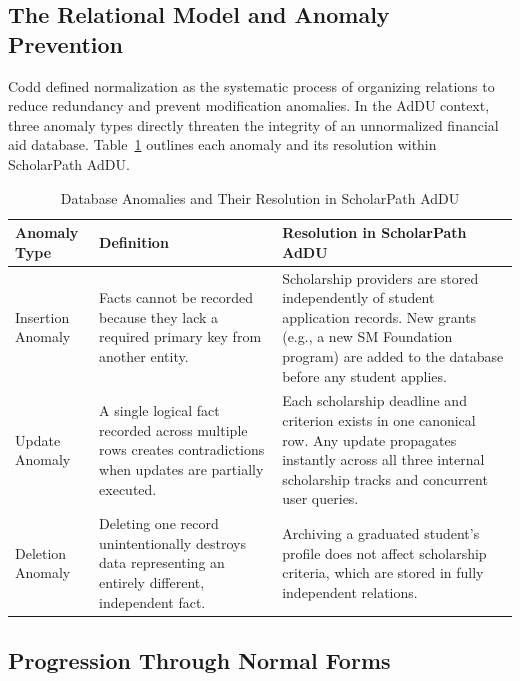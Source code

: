\subsection{The Relational Model and Anomaly Prevention}

Codd \cite{ref17} defined normalization as the systematic process of organizing relations to reduce redundancy and prevent modification anomalies. In the AdDU context, three anomaly types directly threaten the integrity of an unnormalized financial aid database. Table~\ref{tab:anomalies} outlines each anomaly and its resolution within ScholarPath AdDU. \begin{table}[htbp]
  \centering
  \small
  \begin{tabular}{@{}p{2.6cm} p{5.6cm} p{5.6cm}@{}}
    \toprule
    Anomaly Type & Definition & Resolution in ScholarPath AdDU \\
    \midrule
    Insertion Anomaly & Facts cannot be recorded because they lack a required primary key from another entity. & Scholarship providers are stored independently of student application records. New grants (e.g., a new SM Foundation program) are added to the database before any student applies. \\
    \addlinespace
    Update Anomaly & A single logical fact recorded across multiple rows creates contradictions when updates are partially executed. & Each scholarship deadline and criterion exists in one canonical row. Any update propagates instantly across all three internal scholarship tracks and concurrent user queries. \\
    \addlinespace
    Deletion Anomaly & Deleting one record unintentionally destroys data representing an entirely different, independent fact. & Archiving a graduated student's profile does not affect scholarship criteria, which are stored in fully independent relations. \\
    \bottomrule
  \end{tabular}
  \caption{Database Anomalies and Their Resolution in ScholarPath AdDU}
  \label{tab:anomalies}
\end{table}


\subsection{Progression Through Normal Forms}

